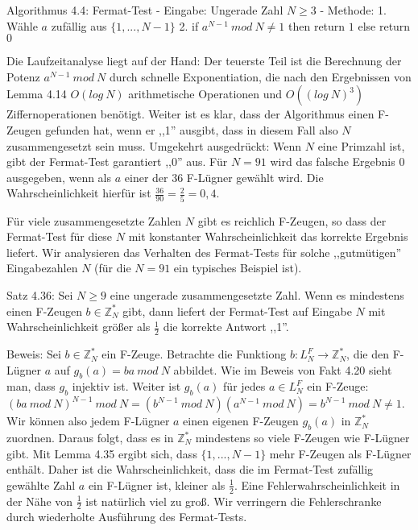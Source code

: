 \documentclass[a4paper]{article}
\begin{document}
\begin{multicols}{3}
        Algorithmus 4.4: Fermat-Test
        - Eingabe: Ungerade Zahl $N\geq 3$
        - Methode:
        1. Wähle $a$ zufällig aus $\{1,...,N-1\}$
        2. if $a^{N-1}\ mod\ N\not= 1$ then return $1$ else return $0$

        Die Laufzeitanalyse liegt auf der Hand: Der teuerste Teil ist die Berechnung der Potenz $a^{N-1}\ mod\ N$ durch schnelle Exponentiation, die nach den Ergebnissen von Lemma 4.14 $O(log\ N)$ arithmetische Operationen und $O((log\ N)^3)$ Ziffernoperationen benötigt. Weiter ist es klar, dass der Algorithmus einen F-Zeugen gefunden hat, wenn er ,,1'' ausgibt, dass in diesem Fall also $N$ zusammengesetzt sein muss. Umgekehrt ausgedrückt: Wenn $N$ eine Primzahl ist, gibt der Fermat-Test garantiert ,,0'' aus. Für $N=91$ wird das falsche Ergebnis $0$ ausgegeben, wenn als $a$ einer der 36 F-Lügner gewählt wird. Die Wahrscheinlichkeit hierfür ist $\frac{36}{90} =\frac{2}{5} = 0,4$.

        Für viele zusammengesetzte Zahlen $N$ gibt es reichlich F-Zeugen, so dass der Fermat-Test für diese $N$ mit konstanter Wahrscheinlichkeit das korrekte Ergebnis liefert. Wir analysieren das Verhalten des Fermat-Tests für solche ,,gutmütigen'' Eingabezahlen $N$ (für die $N=91$ ein typisches Beispiel ist).

        Satz 4.36: Sei $N\geq 9$ eine ungerade zusammengesetzte Zahl. Wenn es mindestens einen F-Zeugen $b\in\mathbb{Z}^*_N$ gibt, dann liefert der Fermat-Test auf Eingabe $N$ mit Wahrscheinlichkeit größer als $\frac{1}{2}$ die korrekte Antwort ,,1''.

        Beweis: Sei $b\in\mathbb{Z}^*_N$ ein F-Zeuge. Betrachte die Funktiong $b:L^F_N\rightarrow\mathbb{Z}^*_N$, die den F-Lügner $a$ auf $g_b(a) =ba\ mod\ N$ abbildet. Wie im Beweis von Fakt 4.20 sieht man, dass $g_b$ injektiv ist. Weiter ist $g_b(a)$ für jedes $a\in L^F_N$ ein F-Zeuge: $(ba\ mod\ N)^{N-1}\ mod\ N= (b^{N-1}\ mod\ N)(a^{N-1}\ mod\ N) =b^{N-1}\ mod\ N\not= 1$.
        Wir können also jedem F-Lügner $a$ einen eigenen F-Zeugen $g_b(a)$ in $\mathbb{Z}^*_N$ zuordnen. Daraus folgt, dass es in $\mathbb{Z}^*_N$ mindestens so viele F-Zeugen wie F-Lügner gibt. Mit Lemma 4.35 ergibt sich, dass $\{1,...,N-1\}$ mehr F-Zeugen als F-Lügner enthält. Daher ist die Wahrscheinlichkeit, dass die im Fermat-Test zufällig gewählte Zahl $a$ ein F-Lügner ist, kleiner als $\frac{1}{2}$.
        Eine Fehlerwahrscheinlichkeit in der Nähe von $\frac{1}{2}$ ist natürlich viel zu groß. Wir verringern die Fehlerschranke durch wiederholte Ausführung des Fermat-Tests.


\end{multicols}
\end{document}
